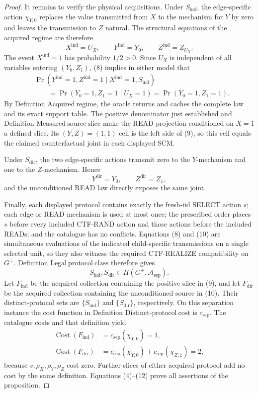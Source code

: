 \documentclass{article}
\begin{document}
\begin{proof}
It remains to verify the physical acquisitions.  Under \(S_{\mathrm{ind}}\), the edge-specific action \(\chi_{Y,0}\) replaces the value transmitted from \(X\) to the mechanism for \(Y\) by zero and leaves the transmission to \(Z\) natural.  The structural equations of the acquired regime are therefore
\[
 X^{\mathrm{ind}}=U_X,
 \qquad Y^{\mathrm{ind}}=Y_0,
 \qquad Z^{\mathrm{ind}}=Z_{U_X}.
\tag{8}
\]
The event \(X^{\mathrm{ind}}=1\) has probability \(1/2>0\).  Since \(U_X\) is independent of all variables entering \((Y_0,Z_1)\), (8) implies in either model that
\[
\begin{aligned}
 &\Pr\!\left(Y^{\mathrm{ind}}=1,Z^{\mathrm{ind}}=1
       \mid X^{\mathrm{ind}}=1,S_{\mathrm{ind}}\right)\\
 &\qquad=\Pr(Y_0=1,Z_1=1\mid U_X=1)
 =\Pr(Y_0=1,Z_1=1).
\end{aligned}
\tag{9}
\]
By Definition \(\mathrm{Acquired\ regime}\), the oracle returns and caches the complete law and its exact support table.  The positive denominator just established and Definition \(\mathrm{Measured\ source\ slice}\) make the READ projection conditioned on \(X=1\) a defined slice.  Its \((Y,Z)=(1,1)\) cell is the left side of (9), so this cell equals the claimed counterfactual joint in each displayed SCM.

Under \(S_{\mathrm{dir}}\), the two edge-specific actions transmit zero to the \(Y\)-mechanism and one to the \(Z\)-mechanism.  Hence
\[
 Y^{\mathrm{dir}}=Y_0,
 \qquad Z^{\mathrm{dir}}=Z_1,
\tag{10}
\]
and the unconditioned READ law directly exposes the same joint.

Finally, each displayed protocol contains exactly the fresh-iid SELECT action \(s\); each edge or READ mechanism is used at most once; the prescribed order places \(s\) before every included CTF-RAND action and those actions before the included READs; and the catalogue has no conflicts.  Equations (8) and (10) are simultaneous evaluations of the indicated child-specific transmissions on a single selected unit, so they also witness the required CTF-REALIZE compatibility on \(G^{+}\).  Definition \(\mathrm{Legal\ protocol\ class}\) therefore gives
\[
 S_{\mathrm{ind}},S_{\mathrm{dir}}\in\Pi(G^{+},\mathcal A_{\mathrm{sep}}).
\tag{11}
\]
Let \(F_{\mathrm{ind}}\) be the acquired collection containing the positive slice in (9), and let \(F_{\mathrm{dir}}\) be the acquired collection containing the unconditioned source in (10).  Their distinct-protocol sets are \(\{S_{\mathrm{ind}}\}\) and \(\{S_{\mathrm{dir}}\}\), respectively.  On this separation instance the cost function in Definition \(\mathrm{Distinct\text{-}protocol\ cost}\) is \(c_{\mathrm{sep}}\).  The catalogue costs and that definition yield
\[
\begin{aligned}
 \operatorname{Cost}(F_{\mathrm{ind}})
 &=c_{\mathrm{sep}}(\chi_{Y,0})=1,\\
 \operatorname{Cost}(F_{\mathrm{dir}})
 &=c_{\mathrm{sep}}(\chi_{Y,0})+c_{\mathrm{sep}}(\chi_{Z,1})=2,
\end{aligned}
\tag{12}
\]
because \(s,\rho_X,\rho_Y,\rho_Z\) cost zero.  Further slices of either acquired protocol add no cost by the same definition.  Equations (4)--(12) prove all assertions of the proposition.
\end{proof}
\end{document}
